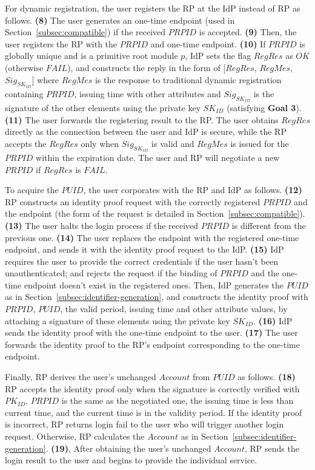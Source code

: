 For dynamic registration, the user registers the RP at the IdP instead of RP as follows. \textbf{(8)} The user generates an one-time endpoint (used in Section~\ref{subsec:compatible}) if the received $PRPID$ is accepted. \textbf{(9)} Then, the user registers the RP with the $PRPID$ and one-time endpoint. \textbf{(10)} If $PRPID$ is globally unique and is a primitive root module $p$, IdP sets the flag $RegRes$ as $OK$ (otherwise $FAIL$), and constructs the reply in the form of
[$RegRes$, $RegMes$, $Sig_{SK_{ID}}$]
where $RegMes$ is the response to traditional dynamic registration containing $PRPID$, issuing time with other attributes and $Sig_{SK_{ID}}$ is the signature of the other elements using the private key $SK_{ID}$ (satisfying \textbf{Goal 3}). \textbf{(11)} The user forwards the registering result to the RP. The user obtains $RegRes$ directly as the connection between the user and IdP is secure, while the RP accepts the $RegRes$ only when $Sig_{SK_{ID}}$ is valid
and $RegMes$ is issued for the $PRPID$ within the expiration date. The user and RP will negotiate a new $PRPID$ if $RegRes$ is $FAIL$.

To acquire the $PUID$, the user corporates with the RP and IdP as follows. \textbf{(12)} RP constructs an identity proof request with the correctly registered $PRPID$ and the endpoint (the form of the request is detailed in Section~\ref{subsec:compatible}). \textbf{(13)} The user halts the login process if the received $PRPID$ is different from the previous one. \textbf{(14)} The user replaces the endpoint with the registered one-time endpoint, and sends it with the identity proof request to the IdP. \textbf{(15)} IdP requires the user to provide the correct credentials if the user hasn't been unauthenticated; and rejects the request if the binding of $PRPID$ and the one-time endpoint doesn't exist in the registered ones. Then, IdP generates the $PUID$ as in Section~\ref{subsec:identifier-generation}, and constructs the identity proof with $PRPID$, $PUID$, the valid period, issuing time and other attribute values, by attaching a signature of these elements using the private key $SK_{ID}$. \textbf{(16)} IdP sends the identity proof with the one-time endpoint to the user. \textbf{(17)} The user forwards the identity proof to the RP's endpoint corresponding to the one-time endpoint.

Finally, RP derives the user's unchanged $Account$ from $PUID$ as follows. \textbf{(18)} RP accepts the identity proof only when the signature is correctly verified with $PK_{ID}$, $PRPID$ is the same as the negotiated one, the issuing time is less than current time, and the current time is in the validity period. If the identity proof is incorrect, RP returns login fail to the user who will trigger another login request. Otherwise, RP calculates the $Account$ as in Section~\ref{subsec:identifier-generation}. \textbf{(19)}, After obtaining the user's unchanged $Account$, RP sends the login result to the user and begins to provide the individual service.


